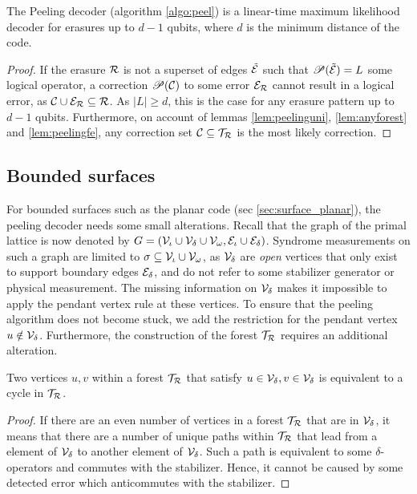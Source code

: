 \begin{theorem}
  The Peeling decoder (algorithm \ref{algo:peel}) is a linear-time maximum likelihood decoder for erasures up to $d-1$ qubits, where $d$ is the minimum distance of the code.
\end{theorem}
\begin{proof}
  If the erasure $\mathcal{R}$ is not a superset of edges $\tilde{\mathcal{E}}$ such that $\mathscr{P}(\tilde{\mathcal{E}})=L$ some logical operator, a correction $\mathscr{P}(\mathcal{C})$ to some error $\mathcal{E}_{\mathcal{R}}$ cannot result in a logical error, as $\mathcal{C}\cup \mathcal{E}_{\mathcal{R}}\subseteq \mathcal{R}$. As $|L|\geq d$, this is the case for any erasure pattern up to $d-1$ qubits. Furthermore, on account of lemmas \ref{lem:peelinguni}, \ref{lem:anyforest} and \ref{lem:peelingfe}, any correction set $\mathcal{C}\subseteq \mathcal{T}_{\mathcal{R}}$ is the most likely correction.
\end{proof}

\subsection{Bounded surfaces}
For bounded surfaces such as the planar code (sec \ref{sec:surface_planar}), the peeling decoder needs some small alterations. Recall that the graph of the primal lattice is now denoted by $G = (\mathcal{V}_\iota\cup \mathcal{V}_{\delta} \cup \mathcal{V}_{\omega}, \mathcal{E}_\iota \cup \mathcal{E}_{\delta})$. Syndrome measurements on such a graph are limited to $\sigma \subseteq \mathcal{V}_\iota\cup \mathcal{V}_\omega$, as $\mathcal{V}_\delta$ are \emph{open} vertices that only exist to support boundary edges $\mathcal{E}_\delta$, and do not refer to some stabilizer generator or physical measurement. The missing information on $\mathcal{V}_\delta$ makes it impossible to apply the pendant vertex rule at these vertices. To ensure that the peeling algorithm does not become stuck, we add the restriction for the pendant vertex $u \notin \mathcal{V}_\delta$. Furthermore, the construction of the forest $\mathcal{T}_{\mathcal{R}}$ requires an additional alteration.
\begin{lemma}
  Two vertices $u,v$ within a forest $\mathcal{T}_{\mathcal{R}}$ that satisfy $u\in \mathcal{V}_\delta, v \in \mathcal{V}_\delta$ is equivalent to a cycle in $\mathcal{T}_{\mathcal{R}}$.
\end{lemma}
\begin{proof}
  If there are an even number of vertices in a forest $\mathcal{T}_{\mathcal{R}}$ that are in $\mathcal{V}_\delta$, it means that there are a number of unique paths within $\mathcal{T}_{\mathcal{R}}$ that lead from a element of $\mathcal{V}_\delta$ to another element of $\mathcal{V}_\delta$. Such a path is equivalent to some $\delta$-operators and commutes with the stabilizer. Hence, it cannot be caused by some detected error which anticommutes with the stabilizer.
\end{proof}

